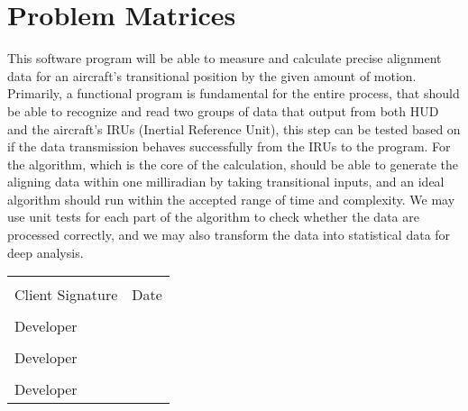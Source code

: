 \documentclass[letterpaper,10pt,titlepage]{article}
\begin{document}
\section*{Problem Matrices}
This software program will be able to measure and calculate precise alignment data for an aircraft’s transitional position by the given amount of motion. Primarily, a functional program is fundamental for the entire process, that should be able to recognize and read two groups of data that output from both HUD and the aircraft’s IRUs (Inertial Reference Unit), this step can be tested based on if the data transmission behaves successfully from the IRUs to the program. For the algorithm, which is the core of the calculation, should be able to generate the aligning data within one milliradian by taking transitional inputs, and an ideal algorithm should run within the accepted range of time and complexity. We may use unit tests for each part of the algorithm to check whether the data are processed correctly, and we may also transform the data into statistical data for deep analysis. 


\newpage
	\noindent\begin{tabular}{ll}
	\\[2cm]
	\makebox[2.5in]{\hrulefill} & \makebox[2.5in]{\hrulefill}\\
	Client Signature& Date\\[8ex]%
	\makebox[2.5in]{\hrulefill}\\
	Developer\\[8ex]
	\makebox[2.5in]{\hrulefill}\\
	Developer\\[8ex]
	\makebox[2.5in]{\hrulefill}\\
	Developer\\[8ex]
	\end{tabular}
\end{document}
